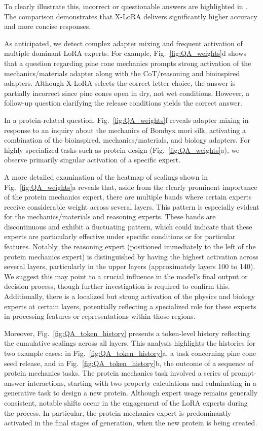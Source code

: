 To clearly illustrate this, incorrect or questionable answers are highlighted in . The comparison demonstrates that X-LoRA delivers significantly higher accuracy and more concise responses.

As anticipated, we detect complex adapter mixing and frequent activation of multiple dominant LoRA experts. For example, Fig.~\ref{fig:QA_weights}d shows that a question regarding pine cone mechanics prompts strong activation of the mechanics/materials adapter along with the CoT/reasoning and bioinspired adapters. Although X-LoRA selects the correct letter choice, the answer is partially incorrect since pine cones open in dry, not wet conditions. However, a follow-up question clarifying the release conditions yields the correct answer.

In a protein-related question, Fig.~\ref{fig:QA_weights}f reveals adapter mixing in response to an inquiry about the mechanics of Bombyx mori silk, activating a combination of the bioinspired, mechanics/materials, and biology adapters. For highly specialized tasks such as protein design (Fig.~\ref{fig:QA_weights}a), we observe primarily singular activation of a specific expert.

A more detailed examination of the heatmap of scalings shown in Fig.~\ref{fig:QA_weights}a reveals that, aside from the clearly prominent importance of the protein mechanics expert, there are multiple bands where certain experts receive considerable weight across several layers. This pattern is especially evident for the mechanics/materials and reasoning experts. These bands are discontinuous and exhibit a fluctuating pattern, which could indicate that these experts are particularly effective under specific conditions or for particular features. Notably, the reasoning expert (positioned immediately to the left of the protein mechanics expert) is distinguished by having the highest activation across several layers, particularly in the upper layers (approximately layers 100 to 140). We suggest this may point to a crucial influence in the model’s final output or decision process, though further investigation is required to confirm this. Additionally, there is a localized but strong activation of the physics and biology experts at certain layers, potentially reflecting a specialized role for these experts in processing features or representations within those regions.

Moreover, Fig.~\ref{fig:QA_token_history} presents a token-level history reflecting the cumulative scalings across all layers. This analysis highlights the histories for two example cases: in Fig.~\ref{fig:QA_token_history}a, a task concerning pine cone seed release, and in Fig.~\ref{fig:QA_token_history}b, the outcome of a sequence of protein mechanics tasks. The protein mechanics task involved a series of prompt-answer interactions, starting with two property calculations and culminating in a generative task to design a new protein. Although expert usage remains generally consistent, notable shifts occur in the engagement of the LoRA experts during the process. In particular, the protein mechanics expert is predominantly activated in the final stages of generation, when the new protein is being created.

